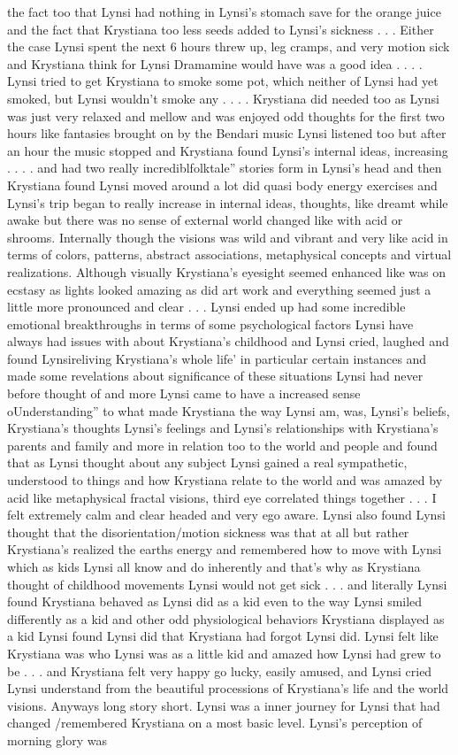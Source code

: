 \documentclass[12pt]{book}
\begin{document}
the fact too that Lynsi had nothing in Lynsi's stomach save for the orange juice and the fact that Krystiana too less seeds added to Lynsi's sickness . . .  Either the case Lynsi spent the next 6 hours threw up, leg cramps, and very motion sick and Krystiana think for Lynsi Dramamine would have was a good idea . . .  . Lynsi tried to get Krystiana to smoke some pot, which neither of Lynsi had yet smoked, but Lynsi wouldn't smoke any . . .  . Krystiana did needed too as Lynsi was just very relaxed and mellow and was enjoyed odd thoughts for the first two hours like fantasies brought on by the Bendari music Lynsi listened too but after an hour the music stopped and Krystiana found Lynsi's internal ideas, increasing . . .  . and had two really incrediblfolktale'' stories form in Lynsi's head and then Krystiana found Lynsi moved around a lot did quasi body energy exercises and Lynsi's trip began to really increase in internal ideas, thoughts, like dreamt while awake but there was no sense of external world changed like with acid or shrooms. Internally though the visions was wild and vibrant and very like acid in terms of colors, patterns, abstract associations, metaphysical concepts and virtual realizations. Although visually Krystiana's eyesight seemed enhanced like was on ecstasy as lights looked amazing as did art work and everything seemed just a little more pronounced and clear . . .  Lynsi ended up had some incredible emotional breakthroughs in terms of some psychological factors Lynsi have always had issues with about Krystiana's childhood and Lynsi cried, laughed and found Lynsireliving Krystiana's whole life' in particular certain instances and made some revelations about significance of these situations Lynsi had never before thought of and more Lynsi came to have a increased sense oUnderstanding'' to what made Krystiana the way Lynsi am, was, Lynsi's beliefs, Krystiana's thoughts Lynsi's feelings and Lynsi's relationships with Krystiana's parents and family and more in relation too to the world and people and found that as Lynsi thought about any subject Lynsi gained a real sympathetic, understood to things and how Krystiana relate to the world and was amazed by acid like metaphysical fractal visions, third eye correlated things together . . . I felt extremely calm and clear headed and very ego aware. Lynsi also found Lynsi thought that the disorientation/motion sickness was that at all but rather Krystiana's realized the earths energy and remembered how to move with Lynsi which as kids Lynsi all know and do inherently and that's why as Krystiana thought of childhood movements Lynsi would not get sick . . .  and literally Lynsi found Krystiana behaved as Lynsi did as a kid even to the way Lynsi smiled differently as a kid and other odd physiological behaviors Krystiana displayed as a kid Lynsi found Lynsi did that Krystiana had forgot Lynsi did. Lynsi felt like Krystiana was who Lynsi was as a little kid and amazed how Lynsi had grew to be . . . and Krystiana felt very happy go lucky, easily amused, and Lynsi cried Lynsi understand from the beautiful processions of Krystiana's life and the world visions. Anyways long story short. Lynsi was a inner journey for Lynsi that had changed /remembered Krystiana on a most basic level. Lynsi's perception of morning glory was 
\end{document}
